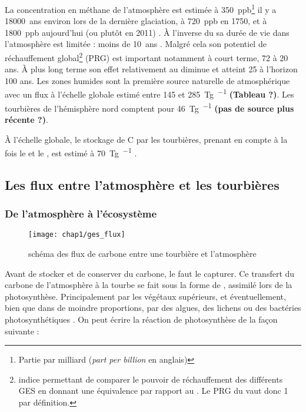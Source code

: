 La concentration en méthane de l'atmosphère est estimée à \SI{350}{ppb}\footnote{Partie par milliard (\textit{part per billion} en anglais)} il y a \SI{18000}{ans} environ lors de la dernière glaciation, à \SI{720}{ppb} en 1750, et à \SI{1800}{ppb} aujourd'hui (ou plutôt en 2011) \citep{Ciais2014}.
À l'inverse du \coo sa durée de vie dans l'atmosphère est limitée : moins de \SI{10}{ans} \citep{lelieveld1998,prather2012}.
Malgré cela son potentiel de réchauffement global\footnote{indice permettant de comparer le pouvoir de réchauffement des différents GES en donnant une équivalence par rapport au \coo. Le PRG du \coo vaut donc 1 par définition.} (PRG) est important notamment à court terme, 72 à 20 ans.
À plus long terme son effet relativement au \coo diminue et atteint 25 à l'horizon 100 ans.
Les zones humides sont la première source naturelle de \chh atmosphérique avec un flux à l'échelle globale estimé entre \num{145} et \SI{285}{\tera\gram\per\year} \citep{lelieveld1998,wuebbles2002,Ciais2014} \textbf{(Tableau ?)}.
Les tourbières de l'hémisphère nord comptent pour \SI{46}{\tera\gram\per\year} \citep{gorham1991} \textbf{(pas de source plus récente ?)}.


À l'échelle globale, le stockage de C par les tourbières, prenant en compte à la fois le \coo et le \chh, est estimé à \SI{70}{\tera\gram\per\year} \citep{clymo1998}.

\subsection{Les flux entre l'atmosphère et les tourbières}

\subsubsection{De l'atmosphère à l'écosystème}

\begin{figure}
\centering
\texttt{[image: chap1/ges\_flux]}
\caption{schéma des flux de carbone entre une tourbière et l'atmosphère}
\label{fig:ges_flux}
\end{figure}

Avant de stocker et de conserver du carbone, le faut le capturer.
Ce transfert du carbone de l'atmosphère à la tourbe se fait sous la forme de \coo, assimilé lors de la photosynthèse.
Principalement par les végétaux supérieurs, et éventuellement, bien que dans de moindre proportions, par des algues, des lichens ou des bactéries photosynthétiques \citep{girard2011}.
On peut écrire la réaction de photosynthèse de la façon suivante : 

